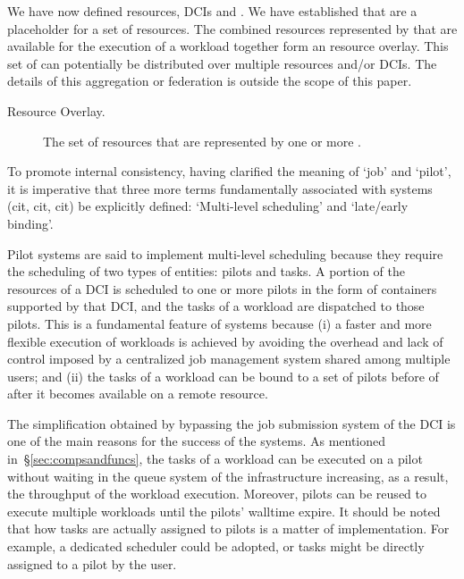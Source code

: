 \documentclass{sig-alternate}
\begin{document}
We have now defined resources, DCIs and \pilots.
We have established that \pilots are a placeholder for a set of resources.
The combined resources represented by \pilots that are available for the
execution of a workload together form an resource overlay.
This set of \pilots can potentially be distributed over multiple resources
and/or DCIs. The details of this aggregation or federation is outside the scope
of this paper.

\begin{description}
\item[Resource Overlay.] The set of resources that are represented by one or more \pilots.
\end{description}

To promote internal consistency, having clarified the meaning of `job'
and `pilot', it is imperative that three more terms fundamentally
associated with \pilot systems (cit, cit, cit) be explicitly defined:
`Multi-level scheduling' and `late/early binding'.

Pilot systems are said to implement multi-level scheduling because they
require the scheduling of two types of entities: pilots and tasks. A
portion of the resources of a DCI is scheduled to one or more pilots in
the form of containers supported by that DCI, and the tasks of a
workload are dispatched to those pilots. This is a fundamental feature of
\pilot systems because (i) a faster and more flexible execution of
workloads is achieved by avoiding the overhead and lack of control
imposed by a centralized job management system shared among multiple
users; and (ii) the tasks of a workload can be bound to a set of
pilots before of after it becomes available on a remote resource.

The simplification obtained by bypassing the job submission system of
the DCI is one of the main reasons for the success of the \pilot
systems. As mentioned in~\S\ref{sec:compsandfuncs}, the tasks of a workload can
be executed on a pilot without waiting in the queue system of the
infrastructure increasing, as a result, the throughput of the workload
execution. Moreover, pilots can be reused to execute multiple workloads
until the pilots' walltime expire. It should be noted that how tasks are
actually assigned to pilots is a matter of implementation. For example,
a dedicated scheduler could be adopted, or tasks might be directly
assigned to a pilot by the user.
\end{document}
